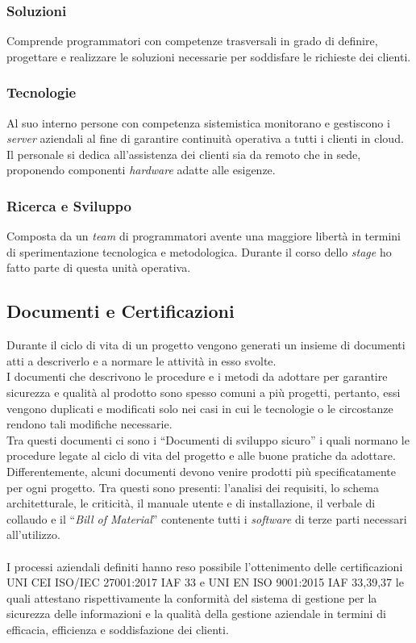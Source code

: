\subsubsection*{Soluzioni}
Comprende programmatori con competenze trasversali in grado di definire, progettare e realizzare le soluzioni necessarie per soddisfare le richieste dei clienti. 

\subsubsection*{Tecnologie}
Al suo interno persone con competenza sistemistica monitorano e gestiscono i \emph{server} aziendali al fine di garantire continuità operativa a tutti i clienti in \gls{cloud}. Il personale si dedica all'assistenza dei clienti sia da remoto che in sede, proponendo componenti \emph{hardware} adatte alle esigenze. 

\subsubsection*{Ricerca e Sviluppo}
Composta da un \emph{team} di programmatori avente una maggiore libertà in termini di sperimentazione tecnologica e metodologica. Durante il corso dello \emph{stage} ho fatto parte di questa \gls{unità operativa}. 

\subsection{Documenti e Certificazioni}
Durante il ciclo di vita di un progetto vengono generati un insieme di documenti atti a descriverlo e a normare le attività in esso svolte.\\
I documenti che descrivono le procedure e i metodi da adottare per garantire sicurezza e qualità al prodotto sono spesso comuni a più progetti, pertanto, essi vengono duplicati e modificati solo nei casi in cui le tecnologie o le circostanze rendono tali modifiche necessarie.\\
Tra questi documenti ci sono i “Documenti di sviluppo sicuro” i quali normano le procedure legate al ciclo di vita del progetto e alle buone pratiche da adottare.\\ 
Differentemente, alcuni documenti devono venire prodotti più specificatamente per ogni progetto. Tra questi sono presenti: l'analisi dei requisiti, lo schema architetturale, le criticità, il manuale utente e di installazione, il verbale di collaudo e il “\emph{Bill of Material}” contenente tutti i \emph{software} di terze parti necessari all'utilizzo.\\\\
I processi aziendali definiti hanno reso possibile l'ottenimento delle certificazioni UNI CEI ISO/IEC 27001:2017 IAF 33 e UNI EN ISO 9001:2015 IAF 33,39,37 le quali attestano rispettivamente la conformità del sistema di gestione per la sicurezza delle informazioni e la qualità della gestione aziendale in termini di efficacia, efficienza e soddisfazione dei clienti. 


